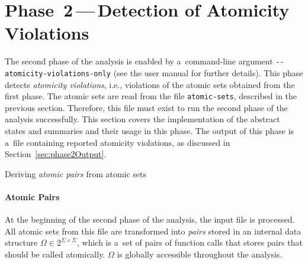\section{\texorpdfstring{Phase~2\,---\,Detection of Atomicity Violations}{Phase~2 - Detection of Atomicity Violations}}
\label{sec:implementPhase2}

The second phase of the analysis is enabled by a~command-line argument \texttt{-{}-atomicity-violations-only} (see the user manual for further details). This phase detects \emph{atomicity violations}, i.e., violations of the atomic sets obtained from the first phase. The atomic sets are read from the file \texttt{atomic-sets}, described in the previous section. Therefore, this file must exist to run the second phase of the analysis successfully. This section covers the implementation of the abstract states and summaries and their usage in this phase. The output of this phase is a~file containing reported atomicity violations, as discussed in Section~\ref{sec:phase2Output}.

\begin{algorithm}[hbt]
%
%
    \caption{Deriving \emph{atomic pairs} from atomic sets}
    \label{alg:phase2AtomicPairs}
\end{algorithm}

\paragraph{Atomic Pairs}
At the beginning of the second phase of the analysis, the input file is processed. All atomic sets from this file are transformed into \emph{pairs} stored in an internal data structure $ \Omega \in 2^{\Sigma \times \Sigma} $, which is a~set of pairs of function calls that stores pairs that should be called atomically. $ \Omega $ is globally accessible throughout the analysis.

